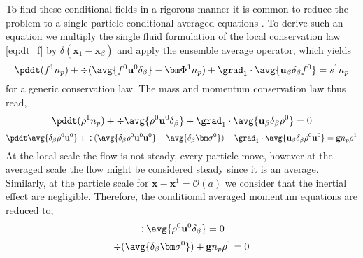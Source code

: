 To find these conditional fields in a rigorous manner it is common to reduce the problem to a single particle conditional averaged equations \citep{hinch1977averaged}. 
To derive such an equation we multiply the single fluid formulation of the local conservation law \ref{eq:dt_f} by $\delta(\textbf{x}_1 -\textbf{x}_\beta)$ and apply the ensemble average operator, which yields
\begin{equation}
    \pddt (f^1n_p)
    + \div(
        \avg{f^0\textbf{u}^0\delta_\beta}
    - \bm\Phi^1n_p)
    + \grad_1 \cdot
        \avg{\textbf{u}_\beta\delta_\beta f^0}
    = s^1n_p
\end{equation}
for a generic conservation law. 
The mass and momentum conservation law thus read, 
\begin{equation}
    \pddt (\rho^1n_p)
    + \div \avg{\rho^0\textbf{u}^0\delta_\beta}
    + \grad_1 \cdot
    \avg{\textbf{u}_\beta\delta_\beta \rho^0}
    = 0
\end{equation}
\begin{equation}
    \pddt \avg{\delta_\beta \rho^0 \textbf{u}^0}
    + \div(
        \avg{\delta_\beta \rho^0 \textbf{u}^0 \textbf{u}^0 }
    - \avg{\delta_\beta\bm\sigma^0})
    + \grad_1 \cdot
        \avg{\textbf{u}_\beta\delta_\beta \rho^0 \textbf{u}^0}
    = \textbf{g} n_p \rho^1
\end{equation}
At the local scale the flow is not steady, every particle move, however at the averaged scale the flow might be considered steady since it is an average. 
Similarly, at the particle scale for $\textbf{x} - \textbf{x}^1 = \mathcal{O}(a)$ we consider that the inertial effect are negligible. 
Therefore, the conditional averaged momentum equations are reduced to, 
\begin{equation}
    \div \avg{\rho^0\textbf{u}^0\delta_\beta}
    = 0
\end{equation}
\begin{equation}
    \div(
    \avg{\delta_\beta\bm\sigma^0})
    + \textbf{g} n_p \rho^1
    = 0 
\end{equation}



